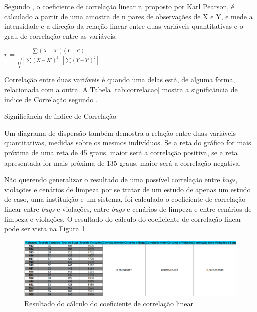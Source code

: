 Segundo \cite{Wasserman2010}, o coeficiente de correlação linear r, proposto por Karl Pearson, é calculado a partir de uma amostra de n pares de observações de X e Y, e mede a intensidade e a direção da relação linear entre duas variáveis quantitativas e o grau de correlação entre as variáveis:

$ r = \frac{\sum(X-X')(Y-Y')}{\sqrt{[\sum(X-X')^{2}][\sum(Y-Y')^{2}]}} $


Correlação entre duas variáveis é quando uma delas está, de alguma forma, relacionada com a outra. A Tabela \ref{tab:correlacao} mostra a significância de índice de Correlação segundo \cite{Wasserman2010}.

\begin{table}[!ht]
	\begin{center}
 
	\caption{Significância de índice de Correlação}
	\label{tab:correlacao}
	\end{center}
	\end{table}	
	\FloatBarrier

Um diagrama de dispersão também demostra a relação entre duas variáveis quantitativas, medidas sobre os mesmos indivíduos. Se a reta do gráfico for mais próxima de
uma reta de 45 graus, maior será a correlação positiva, se a reta apresentada for mais próxima de 135 graus, maior será a correlação negativa. 

Não querendo generalizar o resultado de uma possível correlação entre \textit{bugs}, violações e cenários de limpeza por se tratar de um estudo de apenas um estudo de caso, uma instituição e um sistema, foi calculado o coeficiente de correlação linear entre \textit{bugs} e violações, entre \textit{bugs} e cenários de limpeza e entre cenários de limpeza e violações. O resultado do cálculo do coeficiente de correlação linear pode ser vista na Figura \ref{correlacao}.

\begin{figure}[H]
\centering
\includegraphics[keepaspectratio=false,scale=0.40,angle=90]{figuras/figuras_nilton/correlacao.eps}
\caption{Resultado do cálculo do coeficiente de correlação linear}
\label{correlacao}
\end{figure}

